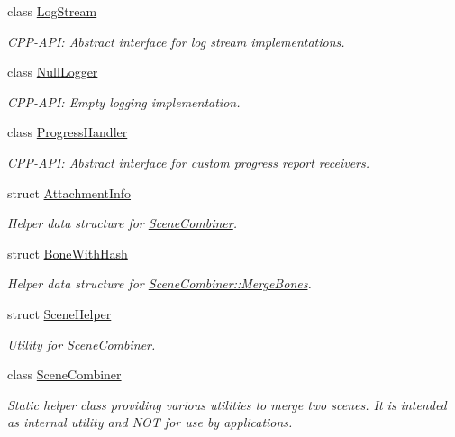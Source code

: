 \begin{CompactItemize}
class \hyperlink{class_assimp_1_1_log_stream}{LogStream}
\begin{CompactList}\small\item\em CPP-API: Abstract interface for log stream implementations. \item\end{CompactList}\item 
class \hyperlink{class_assimp_1_1_null_logger}{NullLogger}
\begin{CompactList}\small\item\em CPP-API: Empty logging implementation. \item\end{CompactList}\item 
class \hyperlink{class_assimp_1_1_progress_handler}{ProgressHandler}
\begin{CompactList}\small\item\em CPP-API: Abstract interface for custom progress report receivers. \item\end{CompactList}\item 
struct \hyperlink{struct_assimp_1_1_attachment_info}{AttachmentInfo}
\begin{CompactList}\small\item\em Helper data structure for \hyperlink{class_assimp_1_1_scene_combiner}{SceneCombiner}. \item\end{CompactList}\item 
struct \hyperlink{struct_assimp_1_1_bone_with_hash}{BoneWithHash}
\begin{CompactList}\small\item\em Helper data structure for \hyperlink{class_assimp_1_1_scene_combiner_a42d5370510db89cbdd739617a617d4e}{SceneCombiner::MergeBones}. \item\end{CompactList}\item 
struct \hyperlink{struct_assimp_1_1_scene_helper}{SceneHelper}
\begin{CompactList}\small\item\em Utility for \hyperlink{class_assimp_1_1_scene_combiner}{SceneCombiner}. \item\end{CompactList}\item 
class \hyperlink{class_assimp_1_1_scene_combiner}{SceneCombiner}
\begin{CompactList}\small\item\em Static helper class providing various utilities to merge two scenes. It is intended as internal utility and NOT for use by applications. \item\end{CompactList}\end{CompactItemize}
